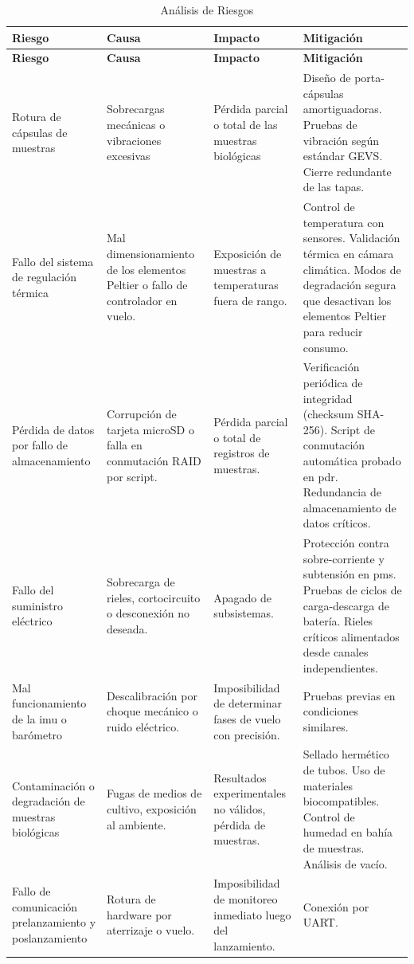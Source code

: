     \begin{longtable}{ | m{2.5cm} | m{3cm} | m{3cm} | m{6cm} | }
      \caption{Análisis de Riesgos} \label{tab:analisis_riesgos} \\
      \hline
      \textbf{Riesgo} & \textbf{Causa} & \textbf{Impacto} & \textbf{Mitigación} \\
      \hline
      \endfirsthead

      \hline
      \textbf{Riesgo} & \textbf{Causa} & \textbf{Impacto} & \textbf{Mitigación} \\
      \hline
      \endhead

      \hline
      \endfoot

      \hline
      \endlastfoot

      Rotura de cápsulas de muestras & Sobrecargas mecánicas o vibraciones excesivas & Pérdida parcial o total de las muestras biológicas & Diseño de porta-cápsulas amortiguadoras. Pruebas de vibración según estándar GEVS. Cierre redundante de las tapas. \\
      \hline
      Fallo del sistema de regulación térmica & Mal dimensionamiento de los elementos Peltier o fallo de controlador en vuelo. & Exposición de muestras a temperaturas fuera de rango. & Control de temperatura con sensores. Validación térmica en cámara climática. Modos de degradación segura que desactivan los elementos Peltier para reducir consumo. \\
      \hline
      Pérdida de datos por fallo de almacenamiento & Corrupción de tarjeta microSD o falla en conmutación RAID por script. & Pérdida parcial o total de registros de muestras. & Verificación periódica de integridad (checksum SHA-256). Script de conmutación automática probado en \acrshort{pdr}. Redundancia de almacenamiento de datos críticos. \\
      \hline
      Fallo del suministro eléctrico & Sobrecarga de rieles, cortocircuito o desconexión no deseada. & Apagado de subsistemas. & Protección contra sobre-corriente y subtensión en \acrshort{pms}. Pruebas de ciclos de carga-descarga de batería. Rieles críticos alimentados desde canales independientes. \\
      \hline
      Mal funcionamiento de la \acrshort{imu} o barómetro & Descalibración por choque mecánico o ruido eléctrico. & Imposibilidad de determinar fases de vuelo con precisión. & Pruebas previas en condiciones similares. \\
      \hline
      Contaminación o degradación de muestras biológicas & Fugas de medios de cultivo, exposición al ambiente. & Resultados experimentales no válidos, pérdida de muestras. & Sellado hermético de tubos. Uso de materiales biocompatibles. Control de humedad en bahía de muestras. Análisis de vacío. \\
      \hline
      Fallo de comunicación prelanzamiento y poslanzamiento  & Rotura de hardware por aterrizaje o vuelo. & Imposibilidad de monitoreo inmediato luego del lanzamiento. & Conexión por UART. \\
      \hline
    \end{longtable}

